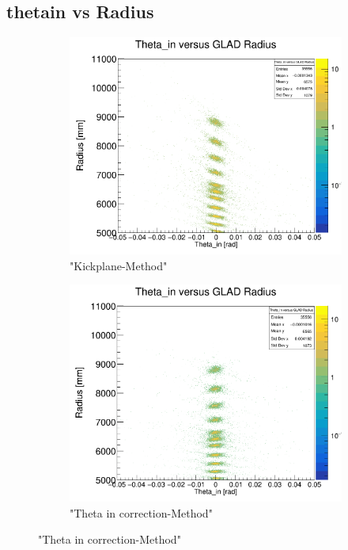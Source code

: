 \documentclass[12pt, letterpaper]{article}
\begin{document}
\subsection{theta\textunderscore in vs Radius}
\begin{figure}[!htbp]
\begin{subfigure}{.5\textwidth}
  \centering
  \includegraphics[width=.9\linewidth]{plot_imgs/theta_in_rho_get_centr.png}  
  \caption{"Kickplane-Method"}
  \label{fig:sub-first}
\end{subfigure}
\begin{subfigure}{.5\textwidth}
  \centering
  \includegraphics[width=.9\linewidth]{plot_imgs/theta_in_rho_corr.png} 
  \caption{"Theta \textunderscore in correction-Method"}
  \label{fig:sub-second}

\end{subfigure}
\end{figure}
\end{document}
